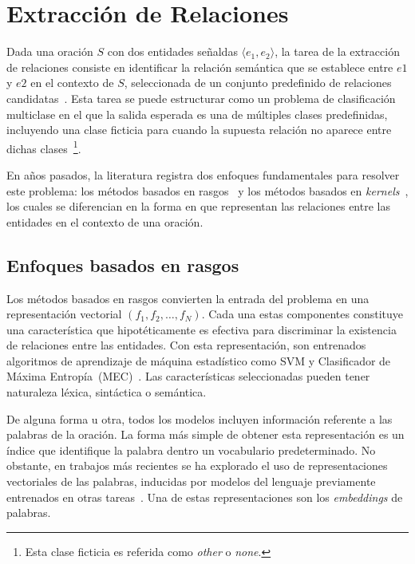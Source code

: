 \section{Extracción de Relaciones}

Dada una oración $S$ con dos entidades señaldas $\langle e_1,e_2 \rangle$, la tarea de la extracción de relaciones consiste en identificar la relación semántica que se establece entre $e1$ y $e2$ en el contexto de $S$, seleccionada de un conjunto predefinido de relaciones candidatas~\cite{hendrickx2009semeval}.
Esta tarea se puede estructurar como un problema de clasificación multiclase en el que la salida esperada es una de múltiples clases predefinidas, incluyendo una clase ficticia para cuando la supuesta relación no aparece entre dichas clases~\footnote{Esta clase ficticia es referida como \textit{other} o \textit{none}.}.

En años pasados, la literatura registra dos enfoques fundamentales para resolver este problema: los métodos basados en rasgos~\cite{kambhatla2004combining, boschee2005automatic, guodong2005exploring, grishman2005nyu, jiang2007systematic, chan2010exploiting, rink2010utd, sun2011semi, rink2010utd, nguyen2014employing} y los métodos basados en \textit{kernels}~\cite{zelenko2003kernel, culotta2004dependency, bunescu2005shortest, qian2008exploiting, nguyen2009convolution, sun2014feature}, los cuales se diferencian en la forma en que representan las relaciones entre las entidades en el contexto de una oración.

\subsection{Enfoques basados en rasgos}

Los métodos basados en rasgos convierten la entrada del problema en una representación vectorial $(f_1,f_2,\dots,f_N)$.
Cada una estas componentes constituye una característica que hipotéticamente es efectiva para discriminar la existencia de relaciones entre las entidades.
Con esta representación, son entrenados algoritmos de aprendizaje de máquina estadístico como SVM y Clasificador de Máxima Entropía~(MEC)~\cite{maxentropy}.
Las características seleccionadas pueden tener naturaleza léxica, sintáctica o semántica.

De alguna forma u otra, todos los modelos incluyen información referente a las palabras de la oración.
La forma más simple de obtener esta representación es un índice que identifique la palabra dentro un vocabulario predeterminado.
No obstante, en trabajos más recientes se ha explorado el uso de representaciones vectoriales de las palabras, inducidas por modelos del lenguaje previamente entrenados en otras tareas~\cite{nguyen2014employing}.
Una de estas representaciones son los \textit{embeddings} de palabras.

